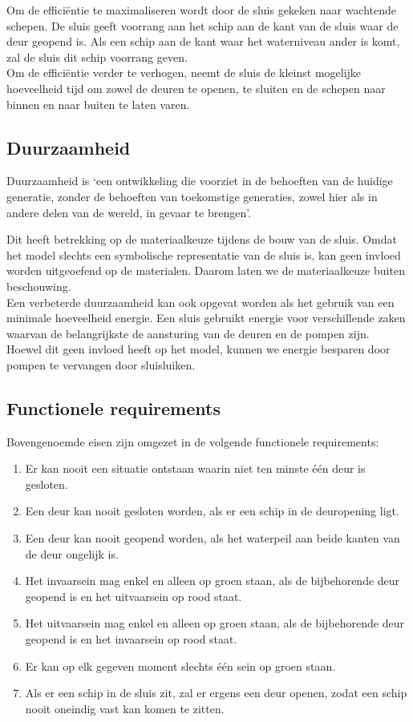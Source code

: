 \documentclass{article} %
\begin{document}
Om de efficiëntie te maximaliseren wordt door de sluis gekeken naar wachtende schepen. De sluis geeft voorrang aan het schip aan de kant van de sluis waar de deur geopend is. Als een schip aan de kant waar het waterniveau ander is komt, zal de sluis dit schip voorrang geven. \\
Om de efficiëntie verder te verhogen, neemt de sluis de kleinst mogelijke hoeveelheid tijd om zowel de deuren te openen, te sluiten en de schepen naar binnen en naar buiten te laten varen.

\subsection{Duurzaamheid}
Duurzaamheid is ‘een ontwikkeling die voorziet in de behoeften van de huidige generatie, zonder de behoeften van toekomstige generaties, zowel hier als in andere delen van de wereld, in gevaar te brengen’. \cite{CBSduurzaamheid} \par

Dit heeft betrekking op de materiaalkeuze tijdens de bouw van de sluis. Omdat het model slechts een symbolische representatie van de sluis is, kan geen invloed worden uitgeoefend op de materialen. Daarom laten we de materiaalkeuze buiten beschouwing. \\
Een verbeterde duurzaamheid kan ook opgevat worden als het gebruik van een minimale hoeveelheid energie. Een sluis gebruikt energie voor verschillende zaken waarvan de belangrijkste de aansturing van de deuren en de pompen zijn. \\
Hoewel dit geen invloed heeft op het model, kunnen we energie besparen door pompen te vervangen door sluisluiken.
\newpage


\subsection{Functionele requirements}
Bovengenoemde eisen zijn omgezet in de volgende functionele requirements:
\begin{enumerate}
    \item Er kan nooit een situatie ontstaan waarin niet ten minste één deur is gesloten.
    \item Een deur kan nooit gesloten worden, als er een schip in de deuropening ligt.
    \item Een deur kan nooit geopend worden, als het waterpeil aan beide kanten van de deur ongelijk is.
    \item Het invaarsein mag enkel en alleen op groen staan, als de bijbehorende deur geopend is en het uitvaarsein op rood staat.
    \item Het uitvaarsein mag enkel en alleen op groen staan, als de bijbehorende deur geopend is en het invaarsein op rood staat.
    \item Er kan op elk gegeven moment slechts één sein op groen staan.
    \item Als er een schip in de sluis zit, zal er ergens een deur openen, zodat een schip nooit oneindig vast kan komen te zitten.
\end{enumerate}
\newpage
\end{document}
